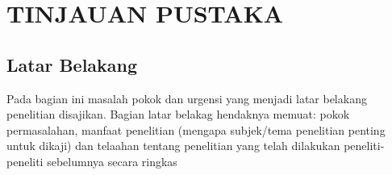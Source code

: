 \chapter{TINJAUAN PUSTAKA}
\section{Latar Belakang}
Pada bagian ini masalah pokok dan urgensi yang menjadi latar belakang penelitian disajikan. Bagian latar belakag hendaknya memuat: pokok permasalahan, manfaat penelitian (mengapa subjek/tema penelitian penting untuk dikaji) dan telaahan tentang penelitian yang telah dilakukan peneliti-peneliti sebelumnya secara ringkas \cite{muthiahPerformanceEvaluationHadoopa} \cite{shiClashTitansMapReduce2015}